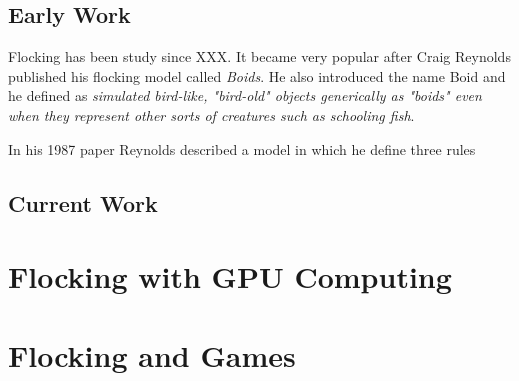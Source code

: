 \subsection{Early Work}
Flocking has been study since XXX. It became very popular after Craig Reynolds published his flocking model called \textit{Boids}\cite{craig1}. He also introduced the name Boid and he defined as \textit{simulated bird-like, "bird-old" objects generically as "boids" even when they represent other sorts of creatures such as schooling fish}. 

In his 1987 paper Reynolds described a model in which he define three rules

\subsection{Current Work}

\section{Flocking with GPU Computing}


\section{Flocking and Games}


